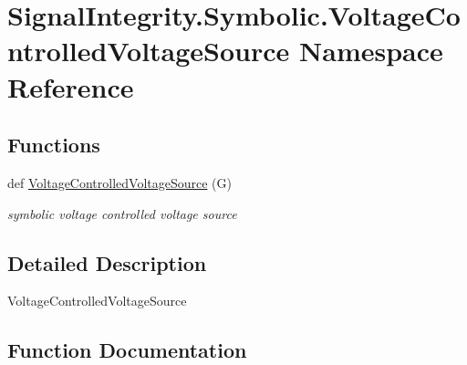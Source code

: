 \hypertarget{namespaceSignalIntegrity_1_1Symbolic_1_1VoltageControlledVoltageSource}{}\section{Signal\+Integrity.\+Symbolic.\+Voltage\+Controlled\+Voltage\+Source Namespace Reference}
\label{namespaceSignalIntegrity_1_1Symbolic_1_1VoltageControlledVoltageSource}
\subsection*{Functions}
\begin{DoxyCompactItemize}
\item 
def \hyperlink{namespaceSignalIntegrity_1_1Symbolic_1_1VoltageControlledVoltageSource_a1a27c0d5d828c0ef8a742bf9d66860f7}{Voltage\+Controlled\+Voltage\+Source} (G)
\begin{DoxyCompactList}\small\item\em symbolic voltage controlled voltage source \end{DoxyCompactList}\end{DoxyCompactItemize}


\subsection{Detailed Description}
\begin{DoxyVerb}VoltageControlledVoltageSource\end{DoxyVerb}
 

\subsection{Function Documentation}
\mbox{\label{namespaceSignalIntegrity_1_1Symbolic_1_1VoltageControlledVoltageSource_a1a27c0d5d828c0ef8a742bf9d66860f7}} 
